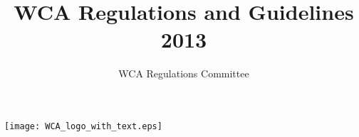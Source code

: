 
\usepackage[top=2cm, bottom=2cm, left=2cm, right=2cm]{geometry}

\usepackage[bookmarksopen=true]{hyperref}

\usepackage{bookmark}
\usepackage{graphicx}

\usepackage{fancyhdr}
\pagestyle{fancy}

\setcounter{secnumdepth}{-1}

\title{WCA Regulations and Guidelines 2013}
\author{WCA Regulations Committee}
\date{\vspace{-1em}}



\maketitle

\begin{center}
\texttt{[image: WCA\_logo\_with\_text.eps]}
\end{center}

\tableofcontents

\newpage


